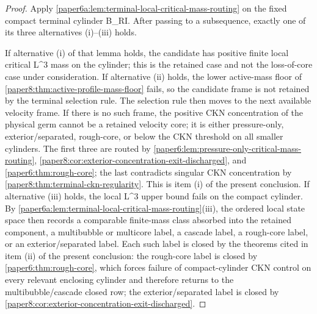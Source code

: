 \documentclass[11pt]{amsart}
\def\({}%
\def\){}%
\theoremstyle{plain}
\theoremstyle{definition}
\theoremstyle{remark}
\begin{document}
\begin{proof}
Apply
\cref{paper6a:lem:terminal-local-critical-mass-routing} on the fixed
compact terminal cylinder \(B_R\times I\).  After passing to a subsequence,
exactly one of its three alternatives \textup{(i)}--\textup{(iii)} holds.

If alternative \textup{(i)} of that lemma holds, the candidate has positive
finite local critical \(L^3\) mass on the cylinder; this is the retained
case and not the loss-of-core case under consideration.  If alternative
\textup{(ii)} holds, the lower active-mass floor of
\cref{paper8:thm:active-profile-mass-floor} fails, so the candidate frame
is not retained by the terminal selection rule.  The selection rule then moves
to the next available velocity frame.  If there is no such frame, the positive
CKN concentration of the physical germ cannot be a retained velocity core; it
is either pressure-only, exterior/separated, rough-core, or below the CKN
threshold on all smaller cylinders.  The first three are routed by
\cref{paper6:lem:pressure-only-critical-mass-routing},
\cref{paper8:cor:exterior-concentration-exit-discharged}, and
\cref{paper6:thm:rough-core}; the last contradicts singular CKN concentration
by \cref{paper8:thm:terminal-ckn-regularity}.  This is item \textup{(i)} of
the present conclusion.  If alternative \textup{(iii)} holds, the local
\(L^3\) upper bound fails on the compact cylinder.  By
\cref{paper6a:lem:terminal-local-critical-mass-routing}\textup{(iii)}, the
ordered local state space then records a comparable finite-mass class
absorbed into the retained component, a multibubble or multicore label, a
cascade label, a rough-core label, or an exterior/separated label.  Each
such label is closed by the theorems cited in item \textup{(ii)} of the
present conclusion: the rough-core label is closed by
\cref{paper6:thm:rough-core}, which forces failure of compact-cylinder CKN
control on every relevant enclosing cylinder and therefore returns to the
multibubble/cascade closed row; the exterior/separated label is closed by
\cref{paper8:cor:exterior-concentration-exit-discharged}.


\end{proof}
\end{document}
